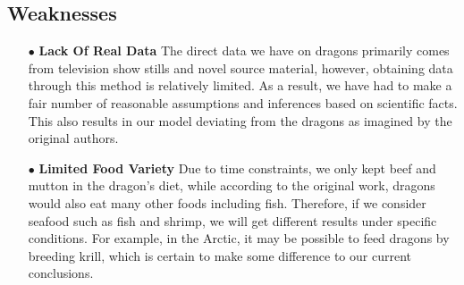 \documentclass[12pt]{article}  %
\begin{document}
\subsection{Weaknesses}
\begin{itemize}

\item[$\bullet$] \textbf{Lack Of Real Data }The direct data we have on dragons primarily comes from television show stills and novel source material, however, obtaining data through this method is relatively limited. As a result, we have had to make a fair number of reasonable assumptions and inferences based on scientific facts. This also results in our model deviating from the dragons as imagined by the original authors.

\item[$\bullet$] \textbf{Limited Food Variety }Due to time constraints, we only kept beef and mutton in the dragon's diet, while according to the original work, dragons would also eat many other foods including fish. Therefore, if we consider seafood such as fish and shrimp, we will get different results under specific conditions. For example, in the Arctic, it may be possible to feed dragons by breeding krill, which is certain to make some difference to our current conclusions.


\end{itemize}
\end{document}
